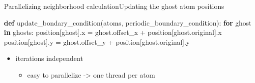 \documentclass[ignorenonframetext,aspectratio=169]{beamer}
\newenvironment{Shaded}{}{}
\newcommand{\ControlFlowTok}[1]{\textcolor[rgb]{0.00,0.44,0.13}{\textbf{#1}}}
\newcommand{\KeywordTok}[1]{\textcolor[rgb]{0.00,0.44,0.13}{\textbf{#1}}}
\newcommand{\NormalTok}[1]{#1}
\newcommand{\OperatorTok}[1]{\textcolor[rgb]{0.40,0.40,0.40}{#1}}
\providecommand{\tightlist}{%
  \setlength{\itemsep}{0pt}\setlength{\parskip}{0pt}}
\begin{document}
\begin{frame}[fragile]{Parallelizing neighborhood calculation}{Updating the ghost atom positions}
    \vspace{-5\baselineskip}
    \begin{scriptsize}
    \begin{Shaded}
        \begin{Highlighting}[]
\KeywordTok{def}\NormalTok{ update_bondary_condition(atoms, periodic_boundary_condition):}
  \ControlFlowTok{for}\NormalTok{ ghost }\KeywordTok{in}\NormalTok{ ghosts:}
\NormalTok{    position[ghost].x }\OperatorTok{=}\NormalTok{ ghost.offset_x }\OperatorTok{+}\NormalTok{ position[ghost.original].x}
\NormalTok{    position[ghost].y }\OperatorTok{=}\NormalTok{ ghost.offset_y }\OperatorTok{+}\NormalTok{ position[ghost.original].y}
        \end{Highlighting}
    \end{Shaded}
    \end{scriptsize}
    \begin{itemize}
        \tightlist
        \item iterations independent
        \begin{itemize}
            \tightlist
            \item easy to parallelize -\textgreater{} one thread per atom
        \end{itemize}
    \end{itemize}
\end{frame}
\end{document}
